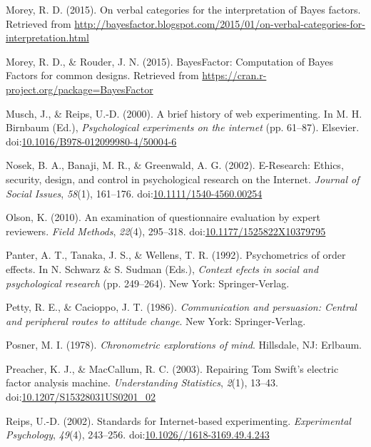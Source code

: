 \documentclass[english,man]{apa6}
\theoremstyle{definition}
\theoremstyle{definition}
\theoremstyle{definition}
\theoremstyle{remark}
\begin{document}
\hypertarget{ref-Morey2015c}{}
Morey, R. D. (2015). On verbal categories for the interpretation of
Bayes factors. Retrieved from
\url{http://bayesfactor.blogspot.com/2015/01/on-verbal-categories-for-interpretation.html}

\hypertarget{ref-Morey2015b}{}
Morey, R. D., \& Rouder, J. N. (2015). BayesFactor: Computation of Bayes
Factors for common designs. Retrieved from
\url{https://cran.r-project.org/package=BayesFactor}

\hypertarget{ref-Musch2000}{}
Musch, J., \& Reips, U.-D. (2000). A brief history of web experimenting.
In M. H. Birnbaum (Ed.), \emph{Psychological experiments on the
internet} (pp. 61--87). Elsevier.
doi:\href{https://doi.org/10.1016/B978-012099980-4/50004-6}{10.1016/B978-012099980-4/50004-6}

\hypertarget{ref-Nosek2002}{}
Nosek, B. A., Banaji, M. R., \& Greenwald, A. G. (2002). E-Research:
Ethics, security, design, and control in psychological research on the
Internet. \emph{Journal of Social Issues}, \emph{58}(1), 161--176.
doi:\href{https://doi.org/10.1111/1540-4560.00254}{10.1111/1540-4560.00254}

\hypertarget{ref-Olson2010}{}
Olson, K. (2010). An examination of questionnaire evaluation by expert
reviewers. \emph{Field Methods}, \emph{22}(4), 295--318.
doi:\href{https://doi.org/10.1177/1525822X10379795}{10.1177/1525822X10379795}

\hypertarget{ref-Panter1992}{}
Panter, A. T., Tanaka, J. S., \& Wellens, T. R. (1992). Psychometrics of
order effects. In N. Schwarz \& S. Sudman (Eds.), \emph{Context efects
in social and psychological research} (pp. 249--264). New York:
Springer-Verlag.

\hypertarget{ref-Petty1986}{}
Petty, R. E., \& Cacioppo, J. T. (1986). \emph{Communication and
persuasion: Central and peripheral routes to attitude change}. New York:
Springer-Verlag.

\hypertarget{ref-Posner1978}{}
Posner, M. I. (1978). \emph{Chronometric explorations of mind}.
Hillsdale, NJ: Erlbaum.

\hypertarget{ref-Preacher2003}{}
Preacher, K. J., \& MacCallum, R. C. (2003). Repairing Tom Swift's
electric factor analysis machine. \emph{Understanding Statistics},
\emph{2}(1), 13--43.
doi:\href{https://doi.org/10.1207/S15328031US0201_02}{10.1207/S15328031US0201\_02}

\hypertarget{ref-Reips2002a}{}
Reips, U.-D. (2002). Standards for Internet-based experimenting.
\emph{Experimental Psychology}, \emph{49}(4), 243--256.
doi:\href{https://doi.org/10.1026//1618-3169.49.4.243}{10.1026//1618-3169.49.4.243}
\end{document}
